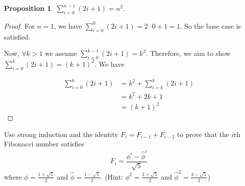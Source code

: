 \documentclass[10pt,letterpaper]{amspset}
\newtheorem{prop}[thm]{Proposition}
\theoremstyle{definition}
\theoremstyle{remark}
\numberwithin{subcase}{case}
\numberwithin{equation}{section}
\begin{document}
\begin{solution}
\begin{prop}
$\sum\limits_{i=0}^{n-1} (2i+1) = n^2$.
\end{prop}

\begin{proof}
For $n=1$, we have $\sum_{i=0}^{0} (2i+1) = 2\cdot0 + 1 = 1$.  So the base case is satisfied.

Now, $\forall k > 1$ we assume $\sum\limits_{i=0}^{k-1} (2i+1) = k^2$.  Therefore, we aim to show $\sum\limits_{i=0}^{k} (2i+1) = (k+1)^2$.  We have 

\begin{align*}
\sum\limits_{i=0}^{k} (2i+1) &= k^2 + \sum\limits_{i=k}^{k} (2i+1) \\
{} &= k^2 + 2k+1 \\
{} &= (k+1)^2
\end{align*}
\end{proof}
\end{solution}

\begin{problem}[12]
Use strong induction and the identity $F_i = F_{i-1} + F_{i-2}$ to prove that the $i$th Fibonacci number satisfies
\[
F_i = \frac{\phi^i - \hat{\phi}^i}{\sqrt{5}}
\]
where $\phi = \frac{1+\sqrt{5}}{2}$ and $\hat{\phi} = \frac{1-\sqrt{5}}{2}$. (Hint: $\phi ^2 = \frac{3+\sqrt{5}}{2}$ and $\hat{\phi}^2 = \frac{3-\sqrt{5}}{2}$)
\end{problem}
\end{document}
